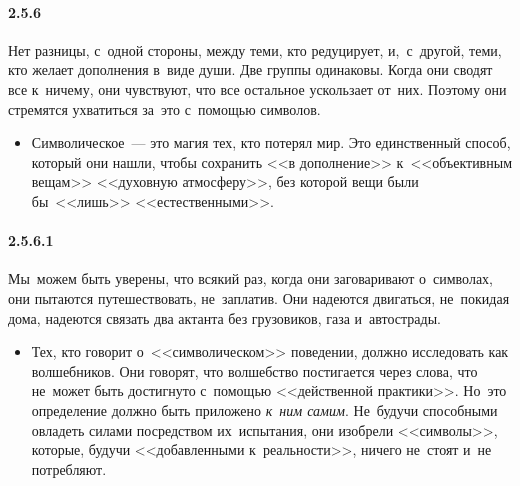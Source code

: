 \paragraph{2.5.6}\hypertarget{par:2.5.6}{} Нет разницы, с~одной стороны, между теми, кто редуцирует, и,~с~другой, теми, кто желает дополнения в~виде души. Две группы одинаковы. Когда они сводят все к~ничему, они чувствуют, что все остальное ускользает от~них. Поэтому они стремятся ухватиться за~это с~помощью символов. 
	\begin{itemize}
	\item 
	Символическое~--- это магия тех, кто потерял мир. Это единственный способ, который они нашли, чтобы сохранить <<в дополнение>> к~<<объективным вещам>> <<духовную атмосферу>>, без которой вещи были бы~<<лишь>> <<естественными>>.
	\end{itemize}

\paragraph{2.5.6.1}\hypertarget{par:2.5.6.1}{} Мы~можем быть уверены, что всякий раз, когда они заговаривают о~символах, они пытаются путешествовать, не~заплатив. Они надеются двигаться, не~покидая дома, надеются связать два актанта без грузовиков, газа и~автострады. 
	\begin{itemize}
	\item 
	Тех, кто говорит о~<<символическом>> поведении, должно исследовать как волшебников. Они говорят, что волшебство постигается через слова, что не~может быть достигнуто с~помощью <<действенной практики>>. Но~это определение должно быть приложено {\itshape к~ним самим}. Не~будучи способными овладеть силами посредством их~испытания, они изобрели <<символы>>, которые, будучи <<добавленными к~реальности>>, ничего не~стоят и~не потребляют.
	\end{itemize}

